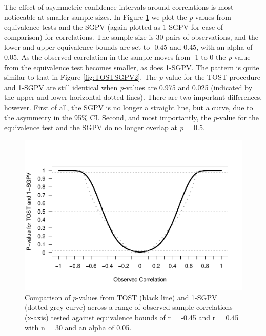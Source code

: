 \documentclass[,man,floatsintext]{apa6}
\begin{document}
The effect of asymmetric confidence intervals around correlations is
most noticeable at smaller sample sizes. In Figure \ref{fig:TOSTSGPV11}
we plot the \emph{p}-values from equivalence tests and the SGPV (again
plotted as 1-SGPV for ease of comparison) for correlations. The sample
size is 30 pairs of observations, and the lower and upper equivalence
bounds are set to -0.45 and 0.45, with an alpha of 0.05. As the observed
correlation in the sample moves from -1 to 0 the \emph{p}-value from the
equivalence test becomes smaller, as does 1-SGPV. The pattern is quite
similar to that in Figure \ref{fig:TOSTSGPV2}. The \emph{p}-value for
the TOST procedure and 1-SGPV are still identical when \emph{p}-values
are 0.975 and 0.025 (indicated by the upper and lower horizontal dotted
lines). There are two important differences, however. First of all, the
SGPV is no longer a straight line, but a curve, due to the asymmetry in
the 95\% CI. Second, and most importantly, the \emph{p}-value for the
equivalence test and the SGPV do no longer overlap at \emph{p} = 0.5.

\begin{figure}
\centering
\includegraphics{manuscript.R1_files/figure-latex/TOSTSGPV11-1.pdf}
\caption{\label{fig:TOSTSGPV11}Comparison of \emph{p}-values from TOST
(black line) and 1-SGPV (dotted grey curve) across a range of observed
sample correlations (x-axis) tested against equivalence bounds of r =
-0.45 and r = 0.45 with n = 30 and an alpha of 0.05.}
\end{figure}
\end{document}
